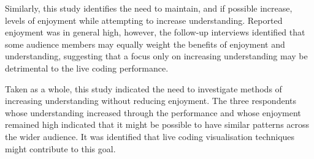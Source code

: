 Similarly, this study identifies the need to maintain, and if possible increase, levels of enjoyment while attempting to increase understanding. Reported enjoyment was in general high, however, the follow-up interviews identified that some audience members may equally weight the benefits of enjoyment and understanding, suggesting that a focus only on increasing understanding may be detrimental to the live coding performance.

Taken as a whole, this study indicated the need to investigate methods of increasing understanding without reducing enjoyment. The three respondents whose understanding increased through the performance and whose enjoyment remained high indicated that it might be possible to have similar patterns across the wider audience. It was identified that live coding visualisation techniques might contribute to this goal.


